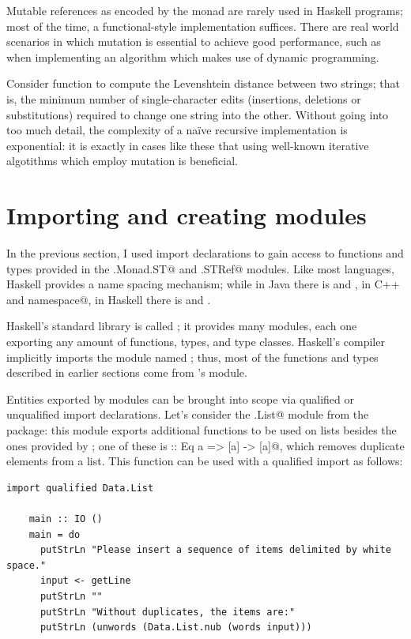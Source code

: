 \documentclass[UdineBachThesis,american,11pt]{PhdThesis}
\begin{document}
  Mutable references as encoded by the \lstinline@ST@ monad are rarely used in
  Haskell programs; most of the time, a functional-style implementation
  suffices. There are real world scenarios in which mutation is essential to
  achieve good performance, such as when implementing an algorithm which makes
  use of dynamic programming.

  Consider function to compute the Levenshtein distance between two strings;
  that is, the minimum number of single-character edits (insertions, deletions
  or substitutions) required to change one string into the other. Without going
  into too much detail, the complexity of a na\"ive recursive implementation is
  exponential: it is exactly in cases like these that using well-known iterative
  algotithms which employ mutation is beneficial.

  \section{Importing and creating modules}

  In the previous section, I used import declarations to gain access to
  functions and types provided in the \lstinline@Control.Monad.ST@ and
  \lstinline@Data.STRef@ modules. Like most languages, Haskell provides a name
  spacing mechanism; while in Java there is \lstinline@package@ and
  \lstinline@import@, in C++ \lstinline@namespace@ and
  \lstinline@using namespace@, in Haskell there is \lstinline@module@ and
  \lstinline@import@.

  Haskell's standard library is called \lstinline@base@; it provides many
  modules, each one exporting any amount of functions, types, and type classes.
  Haskell's compiler implicitly imports the module named \lstinline@Prelude@;
  thus, most of the functions and types described in earlier sections come from
  \lstinline@base@'s \lstinline@Prelude@ module.

  Entities exported by modules can be brought into scope via qualified or
  unqualified import declarations. Let's consider the \lstinline@Data.List@
  module from the \lstinline@base@ package: this module exports additional
  functions to be used on lists besides the ones provided by
  \lstinline@Prelude@; one of these is \lstinline@nub :: Eq a => [a] -> [a]@,
  which removes duplicate elements from a list. This function can be used with a
  qualified import as follows:

  \begin{lstlisting}[gobble=4,basicstyle=\ttfamily\small]
    import qualified Data.List

    main :: IO ()
    main = do
      putStrLn "Please insert a sequence of items delimited by white space."
      input <- getLine
      putStrLn ""
      putStrLn "Without duplicates, the items are:"
      putStrLn (unwords (Data.List.nub (words input)))
  \end{lstlisting}
\end{document}
